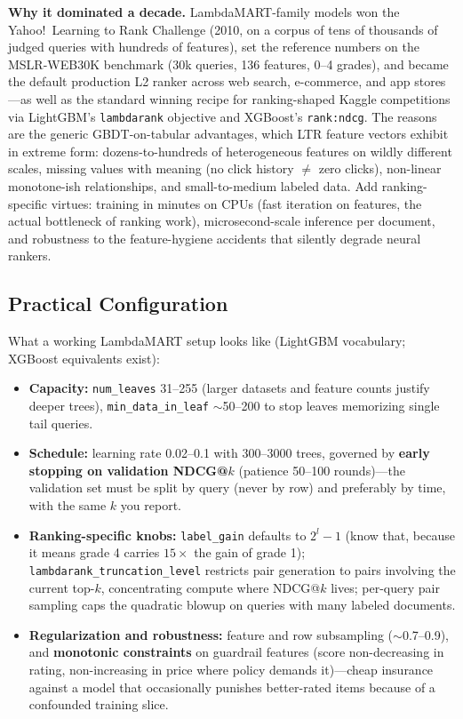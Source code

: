 \textbf{Why it dominated a decade.} LambdaMART-family models won the Yahoo!\ Learning to Rank Challenge (2010, on a corpus of tens of thousands of judged queries with hundreds of features), set the reference numbers on the MSLR-WEB30K benchmark (30k queries, 136 features, 0--4 grades), and became the default production L2 ranker across web search, e-commerce, and app stores---as well as the standard winning recipe for ranking-shaped Kaggle competitions via LightGBM's \texttt{lambdarank} objective and XGBoost's \texttt{rank:ndcg}. The reasons are the generic GBDT-on-tabular advantages, which LTR feature vectors exhibit in extreme form: dozens-to-hundreds of heterogeneous features on wildly different scales, missing values with meaning (no click history $\neq$ zero clicks), non-linear monotone-ish relationships, and small-to-medium labeled data. Add ranking-specific virtues: training in minutes on CPUs (fast iteration on features, the actual bottleneck of ranking work), microsecond-scale inference per document, and robustness to the feature-hygiene accidents that silently degrade neural rankers.

\subsection{Practical Configuration}

What a working LambdaMART setup looks like (LightGBM vocabulary; XGBoost equivalents exist):

\begin{itemize}
    \item \textbf{Capacity:} \texttt{num\_leaves} 31--255 (larger datasets and feature counts justify deeper trees), \texttt{min\_data\_in\_leaf} $\sim$50--200 to stop leaves memorizing single tail queries.
    \item \textbf{Schedule:} learning rate 0.02--0.1 with 300--3000 trees, governed by \textbf{early stopping on validation NDCG@$k$} (patience 50--100 rounds)---the validation set must be split by query (never by row) and preferably by time, with the same $k$ you report.
    \item \textbf{Ranking-specific knobs:} \texttt{label\_gain} defaults to $2^{l}-1$ (know that, because it means grade 4 carries $15\times$ the gain of grade 1); \texttt{lambdarank\_truncation\_level} restricts pair generation to pairs involving the current top-$k$, concentrating compute where NDCG@$k$ lives; per-query pair sampling caps the quadratic blowup on queries with many labeled documents.
    \item \textbf{Regularization and robustness:} feature and row subsampling ($\sim$0.7--0.9), and \textbf{monotonic constraints} on guardrail features (score non-decreasing in rating, non-increasing in price where policy demands it)---cheap insurance against a model that occasionally punishes better-rated items because of a confounded training slice.
\end{itemize}

